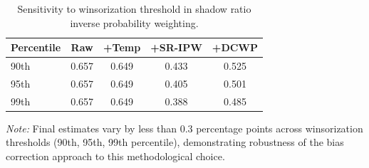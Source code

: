 \begin{table}[t!]
\centering
\caption{Sensitivity to winsorization threshold in shadow ratio inverse probability weighting.}
\label{tab:sensitivity-winsorization}
\small
\begin{tabular}{@{}lcccc@{}}
\toprule
\textbf{Percentile} & \textbf{Raw} & \textbf{+Temp} & \textbf{+SR-IPW} & \textbf{+DCWP} \\
\midrule
90th & 0.657 & 0.649 & 0.433 & 0.525 \\
95th & 0.657 & 0.649 & 0.405 & 0.501 \\
99th & 0.657 & 0.649 & 0.388 & 0.485 \\
\bottomrule
\end{tabular}
\vspace{2pt}
\parbox{0.9\linewidth}{\footnotesize
\textit{Note:} Final estimates vary by less than 0.3 percentage points across winsorization thresholds (90th, 95th, 99th percentile), demonstrating robustness of the bias correction approach to this methodological choice.
}
\end{table}
